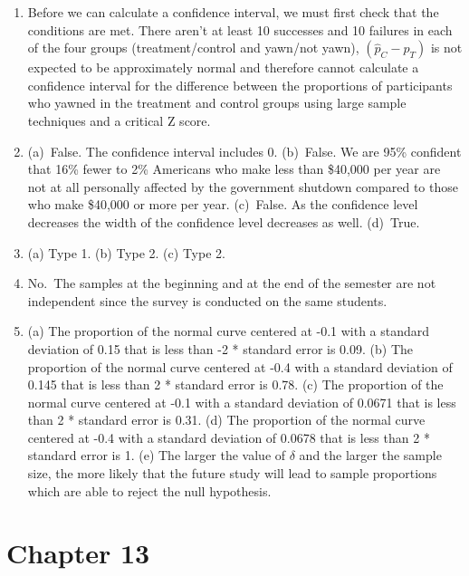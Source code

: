 \documentclass[
  10pt,
  openany]{book}
\begin{document}
\begin{enumerate}
  \addtocounter{enumi}{1}
\item
  Before we can calculate a confidence interval, we must first check that the conditions are met. There aren't at least 10 successes and 10 failures in each of the four groups (treatment/control and yawn/not yawn), \((\hat{p}_C - \hat{p}_T)\) is not expected to be approximately normal and therefore cannot calculate a confidence interval for the difference between the proportions of participants who yawned in the treatment and control groups using large sample techniques and a critical Z score.

  \addtocounter{enumi}{1}
\item
  (a)~False. The confidence interval includes 0. (b)~False. We are 95\% confident that 16\% fewer to 2\% Americans who make less than \$40,000 per year are not at all personally affected by the government shutdown compared to those who make \$40,000 or more per year. (c)~False. As the confidence level decreases the width of the confidence level decreases as well. (d)~True.

  \addtocounter{enumi}{1}
\item
  (a) Type 1. (b) Type 2. (c) Type 2.

  \addtocounter{enumi}{1}
\item
  No.~The samples at the beginning and at the end of the semester are not independent since the survey is conducted on the same students.

  \addtocounter{enumi}{1}
\item
  (a) The proportion of the normal curve centered at -0.1 with a standard deviation of 0.15 that is less than -2 * standard error is 0.09. (b) The proportion of the normal curve centered at -0.4 with a standard deviation of 0.145 that is less than 2 * standard error is 0.78. (c) The proportion of the normal curve centered at -0.1 with a standard deviation of 0.0671 that is less than 2 * standard error is 0.31. (d) The proportion of the normal curve centered at -0.4 with a standard deviation of 0.0678 that is less than 2 * standard error is 1. (e) The larger the value of \(\delta\) and the larger the sample size, the more likely that the future study will lead to sample proportions which are able to reject the null hypothesis.

  \addtocounter{enumi}{1}
\end{enumerate}

\hypertarget{exercise-solutions-19}{%
\section{Chapter 13}\label{exercise-solutions-19}}
\end{document}
